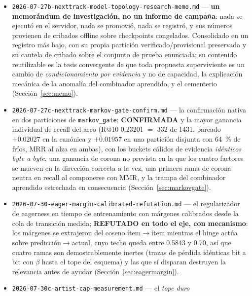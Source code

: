 \documentclass[11pt]{article}
\begin{document}
\begin{itemize}
    modelos --- un sexto nulo de arquitectura, obtenido en el régimen de despliegue
    --- con la varianza por semilla mostrando su dominio sobre la identidad del
    modelo y tres positivos retirados documentados como catálogo de trampas de las
    métricas de generación (Sección~\ref{sec:rollout}).
  \item \texttt{2026-07-27b-nexttrack-model-topology-research-memo.md} ---
    \textbf{un memorándum de investigación, no un informe de campaña}: nada se
    ejecutó en el servidor, nada se promovió, nada se registró, y sus números
    provienen de cribados offline sobre checkpoints congelados. Consolidado en un
    registro más bajo, con su propia partición verificado/provisional preservada y
    su cautela de cribado sobre el conjunto de prueba enunciada; su contenido
    reutilizable es la tesis convergente de que toda propuesta superviviente es un
    cambio de \emph{condicionamiento por evidencia} y no de capacidad, la
    explicación mecánica de la anomalía del combinador aprendido, y el cementerio
    (Sección~\ref{sec:memo}).
  \item \texttt{2026-07-27c-nexttrack-markov-gate-confirm.md} --- la confirmación
    nativa en dos particiones de \texttt{markov\_gate}; \textbf{CONFIRMADA} y la
    mayor ganancia individual de recall del arco (R@10 \num{0.23201} $=$ \num{332}
    de \num{1431}, pareado $+\num{0.02027}$ en la canónica y $+\num{0.01957}$ en
    una partición disjunta con \SI{64}{\percent} de fríos, MRR al alza en ambas),
    con los buckets cálidos de evidencia \emph{idénticos byte a byte}, una ganancia
    de corona no prevista en la que los cuatro factores se mueven en la dirección
    correcta a la vez, una primera rama de corona neutra en recall al componerse con
    MMR, y la trampa del combinador aprendido estrechada en consecuencia
    (Sección~\ref{sec:markovgate}).
  \item \texttt{2026-07-30-eager-margin-calibrated-refutation.md} --- el
    regularizador de eagerness en tiempo de entrenamiento con márgenes calibrados
    desde la cola de transición medida; \textbf{REFUTADO en todo el eje, con
    mecanismo}: los márgenes se extrajeron del coseno ítem$\to$ítem mientras el
    hinge actúa sobre predicción$\to$actual, cuyo techo queda entre \num{0.5843} y
    \num{0.70}, así que cuatro ramas son demostrablemente inertes (trazas de pérdida
    idénticas bit a bit con $\beta$ hasta el tope del esquema) y las que sí disparan
    destruyen la relevancia antes de ayudar (Sección~\ref{sec:eagermargin}).
  \item \texttt{2026-07-30c-artist-cap-measurement.md} --- el \emph{tope duro
}
\end{itemize}
\end{document}
